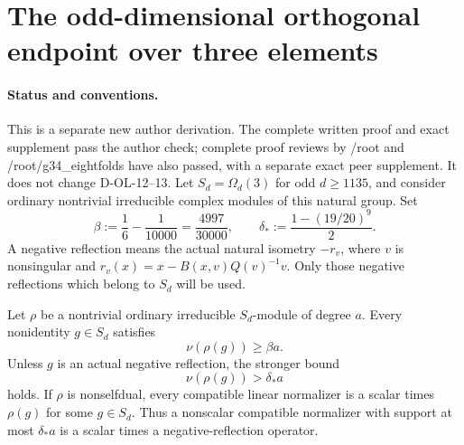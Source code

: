 \section{The odd-dimensional orthogonal endpoint over three elements}
\label{sec:orthogonal-three-odd}

\paragraph{Status and conventions.}
This is a separate new author derivation.  The complete written
proof and exact supplement pass the author check; complete
proof reviews by /root and /root/g34\_eightfolds have also passed,
with a separate exact peer supplement.  It does not
change D-OL-12--13.  Let $S_d=\Omega_d(3)$ for odd $d\ge1135$,
and consider ordinary nontrivial irreducible complex modules
of this natural group.  Set
\[
 \beta:=\frac16-\frac1{10000}=\frac{4997}{30000},\qquad
 \delta_*:=\frac{1-(19/20)^9}{2}.
                                                               \tag{O3.1}
\]
A negative reflection means the actual natural isometry
$-r_v$, where $v$ is nonsingular and
$r_v(x)=x-B(x,v)Q(v)^{-1}v$.  Only those negative reflections
which belong to $S_d$ will be used.

\begin{lemma}
\label{D-OL-14}
Let $\rho$ be a nontrivial ordinary irreducible $S_d$-module of
degree $a$.  Every nonidentity $g\in S_d$ satisfies
\[
                          \nu(\rho(g))\ge\beta a.           \tag{O3.2}
\]
Unless $g$ is an actual negative reflection, the stronger bound
\[
                          \nu(\rho(g))>\delta_*a            \tag{O3.3}
\]
holds.  If $\rho$ is nonselfdual, every compatible linear
normalizer is a scalar times $\rho(g)$ for some $g\in S_d$.
Thus a nonscalar compatible normalizer with support at most
$\delta_*a$ is a scalar times a negative-reflection operator.
\end{lemma}

